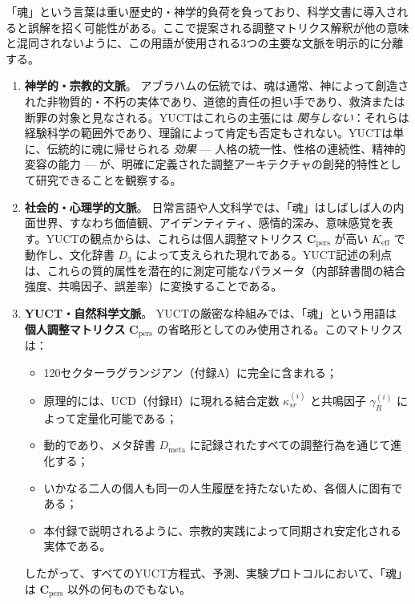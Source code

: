 \documentclass[12pt,a4paper]{article}
\begin{document}
	「魂」という言葉は重い歴史的・神学的負荷を負っており、科学文書に導入されると誤解を招く可能性がある。ここで提案される調整マトリクス解釈が他の意味と混同されないように、この用語が使用される3つの主要な文脈を明示的に分離する。
	
	\begin{enumerate}[leftmargin=*]
		\item \textbf{神学的・宗教的文脈}。
		アブラハムの伝統では、魂は通常、神によって創造された非物質的・不朽の実体であり、道徳的責任の担い手であり、救済または断罪の対象と見なされる。YUCTはこれらの主張には \emph{関与しない}：それらは経験科学の範囲外であり、理論によって肯定も否定もされない。YUCTは単に、伝統的に魂に帰せられる \emph{効果} — 人格の統一性、性格の連続性、精神的変容の能力 — が、明確に定義された調整アーキテクチャの創発的特性として研究できることを観察する。
		
		\item \textbf{社会的・心理学的文脈}。
		日常言語や人文科学では、「魂」はしばしば人の内面世界、すなわち価値観、アイデンティティ、感情的深み、意味感覚を表す。YUCTの観点からは、これらは個人調整マトリクス \(\mathbf{C}_{\text{pers}}\) が高い \(K_{\mathrm{eff}}\) で動作し、文化辞書 \(D_3\) によって支えられた現れである。YUCT記述の利点は、これらの質的属性を潜在的に測定可能なパラメータ（内部辞書間の結合強度、共鳴因子、誤差率）に変換することである。
		
		\item \textbf{YUCT・自然科学文脈}。
		YUCTの厳密な枠組みでは、「魂」という用語は \textbf{個人調整マトリクス} \(\mathbf{C}_{\text{pers}}\) の省略形としてのみ使用される。このマトリクスは：
		\begin{itemize}
			\item 120セクターラグランジアン（付録A）に完全に含まれる；
			\item 原理的には、UCD（付録H）に現れる結合定数 \(\kappa_{sr}^{(i)}\) と共鳴因子 \(\gamma_R^{(i)}\) によって定量化可能である；
			\item 動的であり、メタ辞書 \(D_{\text{meta}}\) に記録されたすべての調整行為を通じて進化する；
			\item いかなる二人の個人も同一の人生履歴を持たないため、各個人に固有である；
			\item 本付録で説明されるように、宗教的実践によって同期され安定化される実体である。
		\end{itemize}
		したがって、すべてのYUCT方程式、予測、実験プロトコルにおいて、「魂」は \(\mathbf{C}_{\text{pers}}\) 以外の何ものでもない。
	\end{enumerate}
	
\end{document}
